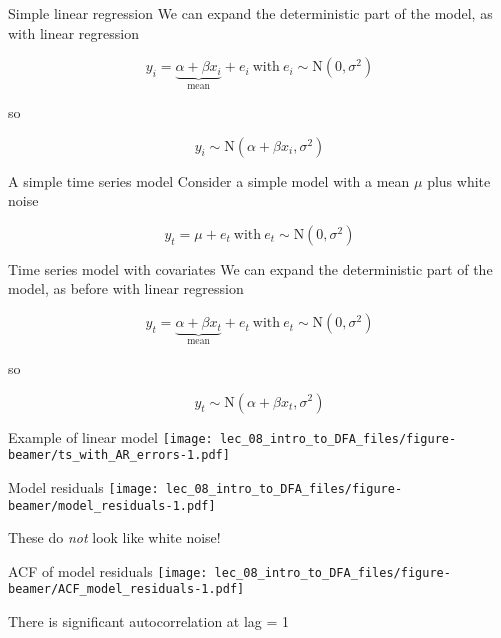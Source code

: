 \documentclass[
  ignorenonframetext,
]{beamer}
\begin{document}
\begin{frame}{Simple linear regression}
\protect\hypertarget{simple-linear-regression}{}
We can expand the deterministic part of the model, as with linear
regression

\[
y_i = \underbrace{\alpha + \beta x_i}_{\text{mean}} + e_i ~ \text{with} ~ e_i \sim \text{N}(0,\sigma^2)
\]

so

\[
y_i \sim \text{N}(\alpha + \beta x_i,\sigma^2)
\]
\end{frame}

\begin{frame}{A simple time series model}
\protect\hypertarget{a-simple-time-series-model}{}
Consider a simple model with a mean \(\mu\) plus white noise

\[
y_t = \mu + e_t ~ \text{with} ~ e_t \sim \text{N}(0,\sigma^2)
\]
\end{frame}

\begin{frame}{Time series model with covariates}
\protect\hypertarget{time-series-model-with-covariates}{}
We can expand the deterministic part of the model, as before with linear
regression

\[
y_t = \underbrace{\alpha + \beta x_t}_{\text{mean}} + e_t ~ \text{with} ~ e_t \sim \text{N}(0,\sigma^2)
\]

so

\[
y_t \sim \text{N}(\alpha + \beta x_t,\sigma^2)
\]
\end{frame}

\begin{frame}{Example of linear model}
\protect\hypertarget{example-of-linear-model}{}
\texttt{[image: lec\_08\_intro\_to\_DFA\_files/figure-beamer/ts\_with\_AR\_errors-1.pdf]}
\end{frame}

\begin{frame}{Model residuals}
\protect\hypertarget{model-residuals}{}
\texttt{[image: lec\_08\_intro\_to\_DFA\_files/figure-beamer/model\_residuals-1.pdf]}

These do \emph{not} look like white noise!
\end{frame}

\begin{frame}{ACF of model residuals}
\protect\hypertarget{acf-of-model-residuals}{}
\texttt{[image: lec\_08\_intro\_to\_DFA\_files/figure-beamer/ACF\_model\_residuals-1.pdf]}

There is significant autocorrelation at lag = 1
\end{frame}
\end{document}
